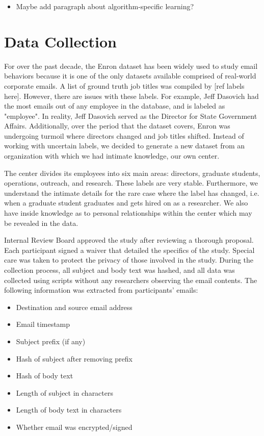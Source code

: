 \documentclass{article}
\begin{document}
\begin{itemize}
\item Maybe add paragraph about algorithm-specific learning?
\end{itemize}

\section{Data Collection} \label{Data Collection}
For over the past decade, the Enron dataset has been widely used to study email behaviors because it is one of the only datasets available comprised of real-world corporate emails.  A list of ground truth job titles was compiled by [ref labels here].  However, there are issues with these labels.  For example, Jeff Dasovich had the most emails out of any employee in the database, and is labeled as "employee".  In reality, Jeff Dasovich served as the Director for State Government Affairs. Additionally, over the period that the dataset covers, Enron was undergoing turmoil where directors changed and job titles shifted.  Instead of working with uncertain labels, we decided to generate a new dataset from an organization with which we had intimate knowledge, our own center.  
\par
The center divides its employees into six main areas: directors, graduate students, operations, outreach, and research.  These labels are very stable.  Furthermore, we understand the intimate details for the rare case where the label has changed, i.e. when a graduate student graduates and gets hired on as a researcher. We also have inside knowledge as to personal relationships within the center which may be revealed in the data.
\par 
Internal Review Board approved the study after reviewing a thorough proposal.  Each participant signed a waiver that detailed the specifics of the study.  Special care was taken to protect the privacy of those involved in the study.  During the collection process, all subject and body text was hashed, and all data was collected using scripts without any researchers observing the email contents.  The following information was extracted from participants' emails:  
\begin{itemize}
\item Destination and source email address
\item Email timestamp
\item Subject prefix (if any)
\item Hash of subject after removing prefix
\item Hash of body text
\item Length of subject in characters
\item Length of body text in characters
\item Whether email was encrypted/signed
\end{itemize}
\end{document}

